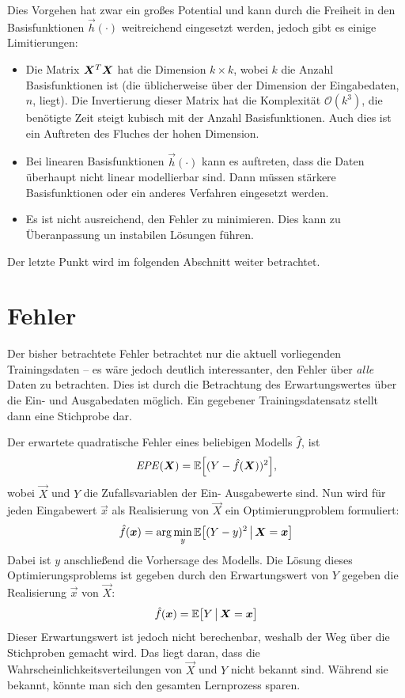 		Dies Vorgehen hat zwar ein großes Potential und kann durch die Freiheit in den Basisfunktionen \( \vec{h}(\cdot) \) weitreichend eingesetzt werden, jedoch gibt es einige Limitierungen:
		\begin{itemize}
			\item Die Matrix \( \bm{X}^T \bm{X} \) hat die Dimension \( k \times k \), wobei \(k\) die Anzahl Basisfunktionen ist (die üblicherweise über der Dimension der Eingabedaten, \(n\), liegt). Die Invertierung dieser Matrix hat die Komplexität \( \mathcal{O}(k^3) \), \dh die benötigte Zeit steigt kubisch mit der Anzahl Basisfunktionen. Auch dies ist ein Auftreten des Fluches der hohen Dimension.
			\item Bei linearen Basisfunktionen \(\vec{h}(\cdot)\) kann es auftreten, dass die Daten überhaupt nicht linear modellierbar sind. Dann müssen stärkere Basisfunktionen oder ein anderes Verfahren eingesetzt werden.
			\item Es ist nicht ausreichend, den Fehler zu minimieren. Dies kann zu Überanpassung un instabilen Lösungen führen.
		\end{itemize}
		Der letzte Punkt wird im folgenden Abschnitt weiter betrachtet.

	\section{Fehler}
		Der bisher betrachtete Fehler betrachtet nur die aktuell vorliegenden Trainingsdaten -- es wäre jedoch deutlich interessanter, den Fehler über \emph{alle} Daten zu betrachten. Dies ist durch die Betrachtung des Erwartungswertes über die Ein- und Ausgabedaten möglich. Ein gegebener Trainingsdatensatz stellt dann eine Stichprobe dar.

		Der erwartete quadratische Fehler eines beliebigen Modells \( \hat{f} \), ist
		\begin{equation}
			\mathit{EPE}(\bm{X}) = \mathbb{E}\Big[ (Y - \hat{f}(\bm{X}))^2 \Big],  \label{eq:rssMean}
		\end{equation}
		wobei \(\vec{X}\) und \(Y\) die Zufallsvariablen der Ein- \bzw Ausgabewerte sind. Nun wird für jeden Eingabewert \(\vec{x}\) als Realisierung von \(\vec{X}\) ein Optimierungproblem formuliert:
		\begin{equation}
			\hat{f}(\bm{x}) = \arg\min_y \mathbb{E}\big[ (Y - y)^2 \,\big\vert\, \bm{X} = \bm{x} \big]
		\end{equation}
		Dabei ist \(y\) anschließend die Vorhersage des Modells. Die Lösung dieses Optimierungsproblems ist gegeben durch den Erwartungswert von \(Y\) gegeben die Realisierung \(\vec{x}\) von \(\vec{X}\):
		\begin{equation}
			\hat{f}(\bm{x}) = \mathbb{E}\big[ Y \,\big\vert\, \bm{X} = \bm{x} \big]
		\end{equation}
		Dieser Erwartungswert ist jedoch \iA nicht berechenbar, weshalb der Weg über die Stichproben gemacht wird. Das liegt daran, dass die Wahrscheinlichkeitsverteilungen von \(\vec{X}\) und \(Y\) nicht bekannt sind. Während sie bekannt, könnte man sich den gesamten Lernprozess sparen.


